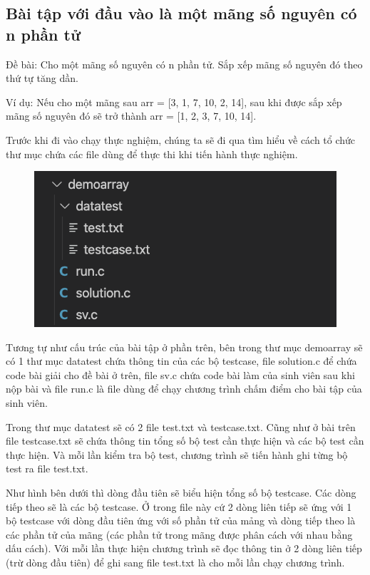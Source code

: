 \documentclass[12pt,a4paper]{article}
\begin{document}
\subsection{Bài tập với đầu vào là một mãng số nguyên có n phần tử}

Đề bài: Cho một mãng số nguyên có n phần tử. Sắp xếp mãng số nguyên đó theo thứ tự tăng dần.

Ví dụ: Nếu cho một mãng sau arr = [3, 1, 7, 10, 2, 14], sau khi được sắp xếp mãng số nguyên đó sẽ trở thành arr = [1, 2, 3, 7, 10, 14].

Trước khi đi vào chạy thực nghiệm, chúng ta sẽ đi qua tìm hiểu về cách tổ chức thư mục chứa các file dùng để thực thi khi tiến hành thực nghiệm. \newpage

\begin{figure}[ht]
\begin{center}
\includegraphics[scale=.3]{hinhanh/cautrucdemoarray.png}
\end{center}
\end{figure}

Tương tự như cấu trúc của bài tập ở phần trên, bên trong thư mục demoarray sẽ có 1 thư mục datatest chứa thông tin của các bộ testcase, file solution.c để chứa code bài giải cho đề bài ở trên, file sv.c chứa code bài làm của sinh viên sau khi nộp bài và file run.c là file dùng để chạy chương trình chấm điểm cho bài tập của sinh viên.

Trong thư mục datatest sẽ có 2 file test.txt và testcase.txt. Cũng như ở bài trên file testcase.txt sẽ chứa thông tin tổng số bộ test cần thực hiện và các bộ test cần thực hiện. Và mỗi lần kiểm tra bộ test, chương trình sẽ tiến hành ghi từng bộ test ra file test.txt.

Như hình bên dưới thì dòng đầu tiên sẽ biểu hiện tổng số bộ testcase. Các dòng tiếp theo sẽ là các bộ testcase. Ở trong file này cứ 2 dòng liên tiếp sẽ ứng với 1 bộ testcase với dòng đầu tiên ứng với số phần tử của mảng và dòng tiếp theo là các phần tử của mãng (các phần tử trong mãng được phân cách với nhau bằng dấu cách). Với mỗi lần thực hiện chương trình sẽ đọc thông tin ở 2 dòng liên tiếp (trừ dòng đầu tiên) để ghi sang file test.txt là cho mỗi lần chạy chương trình.
\end{document}
